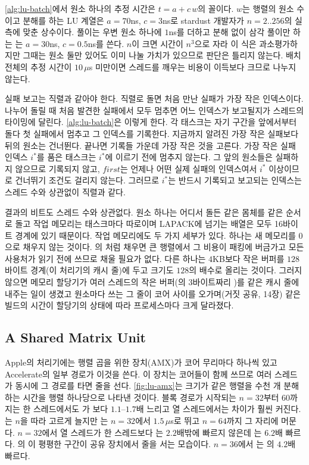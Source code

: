 \cref{alg:lu-batch}에서 원소 하나의 추정 시간은 $t=a+c\,w$의 꼴이다. $w$는 행렬의 원소 수이고 분해를 하는 LU 계열은 $a=70$ns, $c=3$ns로 stardust 개발자가 $n=2..256$의 실측에 맞춘 상수이다. 풀이는 우변 원소 하나에 $1$ns를 더하고 분해 없이 삼각 풀이만 하는 는 $a=30$ns, $c=0.5$ns를 쓴다. $n$이 크면 시간이 $n^3$으로 자라 이 식은 과소평가하지만 그때는 원소 둘만 있어도 이미 나눌 가치가 있으므로 판단은 틀리지 않는다. 배치 전체의 추정 시간이 $10\,\mu$s 미만이면 스레드를 깨우는 비용이 이득보다 크므로 나누지 않는다.

실패 보고는 직렬과 같아야 한다. 직렬로 돌면 처음 만난 실패가 가장 작은 인덱스이다. 나누어 돌릴 때 처음 발견한 실패에서 모두 멈추면 어느 인덱스가 보고될지가 스레드의 타이밍에 달린다. \cref{alg:lu-batch}은 이렇게 한다. 각 태스크는 자기 구간을 앞에서부터 돌다 첫 실패에서 멈추고 그 인덱스를 기록한다. 지금까지 알려진 가장 작은 실패보다 뒤의 원소는 건너뛴다. 끝나면 기록들 가운데 가장 작은 것을 고른다. 가장 작은 실패 인덱스 $i^\ast$를 품은 태스크는 $i^\ast$에 이르기 전에 멈추지 않는다. 그 앞의 원소들은 실패하지 않으므로 기록되지 않고, $\mathit{first}$는 언제나 어떤 실제 실패의 인덱스여서 $i^\ast$ 이상이므로 건너뛰기 조건도 걸리지 않는다. 그러므로 $i^\ast$는 반드시 기록되고 보고되는 인덱스는 스레드 수와 상관없이 직렬과 같다.

결과의 비트도 스레드 수와 상관없다. 원소 하나는 어디서 돌든 같은 몸체를 같은 순서로 돌고 작업 메모리는 태스크마다 따로이며 LAPACK에 넘기는 배열은 모두 16바이트 경계에 있기 때문이다. 작업 메모리에도 두 가지 세부가 있다. 하나는 새 메모리를 $0$으로 채우지 않는 것이다. 의 처럼 채우면 큰 행렬에서 그 비용이 패킹에 버금가고 모든 사용처가 읽기 전에 쓰므로 채울 필요가 없다. 다른 하나는 $4$KB보다 작은 버퍼를 $128$바이트 경계(이 처리기의 캐시 줄)에 두고 크기도 $128$의 배수로 올리는 것이다. 그러지 않으면 메모리 할당기가 여러 스레드의 작은 버퍼(의 $3$바이트짜리 )를 같은 캐시 줄에 내주는 일이 생겼고 원소마다 쓰는 그 줄이 코어 사이를 오가며(거짓 공유, 14장) 같은 빌드의 시간이 할당기의 상태에 따라 프로세스마다 크게 달라졌다.

\subsection{A Shared Matrix Unit}

Apple의 처리기에는 행렬 곱을 위한 장치(AMX)가 코어 무리마다 하나씩 있고 Accelerate의 일부 경로가 이것을 쓴다. 이 장치는 코어들이 함께 쓰므로 여러 스레드가 동시에 그 경로를 타면 줄을 선다. \cref{fig:lu-amx}는 크기가 같은 행렬을 수천 개 분해하는 시간을 행렬 하나당으로 나타낸 것이다. 블록 경로가 시작되는 $n=32$부터 $60$까지는 한 스레드에서도 가 보다 $1.1$--$1.7$배 느리고 열 스레드에서는 차이가 훨씬 커진다. 는 $n$을 따라 고르게 늘지만 는 $n=32$에서 $1.5\,\mu$s로 뛰고 $n=64$까지 그 자리에 머문다. $n=32$에서 열 스레드가 한 스레드보다 는 $2.2$배밖에 빠르지 않은데 는 $6.2$배 빠르다. 의 이 평평한 구간이 공유 장치에서 줄을 서는 모습이다. $n=36$에서 는 의 $4.2$배 빠르다.

